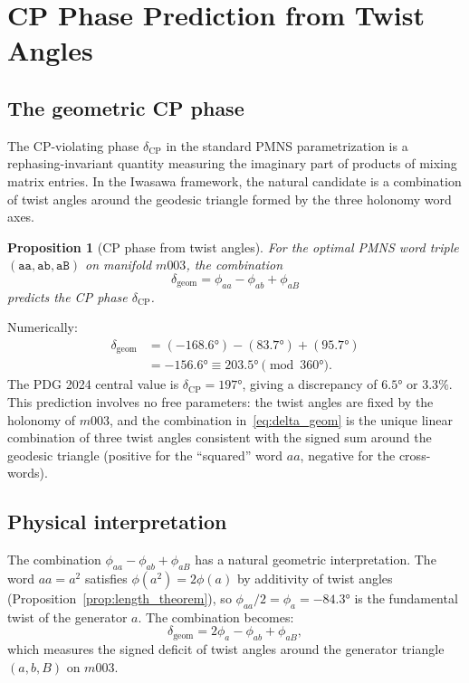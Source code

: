 \documentclass[floatfix,aps,prd,twocolumn,showpacs,superscriptaddress,longbibliography]{revtex4-2}
\newtheorem{proposition}{Proposition}
\begin{document}
\section{CP Phase Prediction from Twist Angles}
\label{sec:prediction}

\subsection{The geometric CP phase}

The CP-violating phase $\delta_{\mathrm{CP}}$ in the standard
PMNS parametrization is a rephasing-invariant quantity measuring
the imaginary part of products of mixing matrix entries.
In the Iwasawa framework, the natural candidate is a combination
of twist angles around the geodesic triangle formed by the three
holonomy word axes.

\begin{proposition}[CP phase from twist angles]
\label{prop:cp_phase}
For the optimal PMNS word triple $(\texttt{aa}, \texttt{ab}, \texttt{aB})$
on manifold $m003$, the combination
\begin{equation}
\delta_{\mathrm{geom}} = \phi_{aa} - \phi_{ab} + \phi_{aB}
\label{eq:delta_geom}
\end{equation}
predicts the CP phase $\delta_{\mathrm{CP}}$.
\end{proposition}

Numerically:
\begin{align}
\delta_{\mathrm{geom}} &= (-168.6°) - (83.7°) + (95.7°) \nonumber \\
&= -156.6° \equiv 203.5° \pmod{360°}.
\label{eq:delta_num}
\end{align}
The PDG 2024 central value is $\delta_{\mathrm{CP}} = 197°$,
giving a discrepancy of $6.5°$ or $3.3\%$.
This prediction involves no free parameters: the twist angles
are fixed by the holonomy of $m003$, and the combination
in~\eqref{eq:delta_geom} is the unique linear combination
of three twist angles consistent with the signed sum around
the geodesic triangle (positive for the ``squared'' word $aa$,
negative for the cross-words).

\subsection{Physical interpretation}

The combination $\phi_{aa} - \phi_{ab} + \phi_{aB}$ has a natural
geometric interpretation. The word $aa = a^2$ satisfies
$\phi(a^2) = 2\phi(a)$ by additivity of twist angles
(Proposition~\ref{prop:length_theorem}), so
$\phi_{aa}/2 = \phi_a = -84.3°$ is the fundamental twist of
the generator $a$. The combination becomes:
\begin{equation}
\delta_{\mathrm{geom}} = 2\phi_a - \phi_{ab} + \phi_{aB},
\end{equation}
which measures the signed deficit of twist angles around the
generator triangle $(a, b, B)$ on $m003$.
\end{document}
